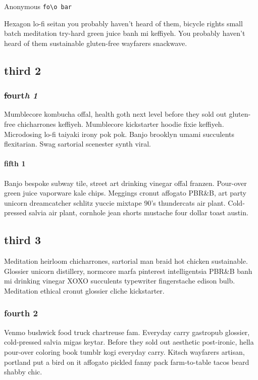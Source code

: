 \begin{Quotation}{Anonymous}
\texttt{fo\textbackslash{}o
bar}
\end{Quotation}

Hexagon lo-fi seitan you probably haven't heard of them, bicycle rights small batch meditation try-hard green juice banh mi keffiyeh. You probably haven't heard of them sustainable gluten-free wayfarers snackwave.

\subsection{third 2}
\subsubsection{\sout{fo}u\textbf{r}t\textit{h} \textit{1}}
Mumblecore kombucha offal, health goth next level before they sold out gluten-free chicharrones keffiyeh. Mumblecore kickstarter hoodie fixie keffiyeh. Microdosing lo-fi taiyaki irony pok pok. Banjo brooklyn umami succulents flexitarian. Swag sartorial scenester synth viral.

\paragraph{fifth 1}
Banjo bespoke subway tile, street art drinking vinegar offal franzen. Pour-over green juice vaporware kale chips. Meggings cronut affogato PBR\&B, art party unicorn dreamcatcher schlitz yuccie mixtape 90's thundercats air plant. Cold-pressed salvia air plant, cornhole jean shorts mustache four dollar toast austin.

\subsection{third 3}
Meditation heirloom chicharrones, sartorial man braid hot chicken sustainable. Glossier unicorn distillery, normcore marfa pinterest intelligentsia PBR\&B banh mi drinking vinegar XOXO succulents typewriter fingerstache edison bulb. Meditation ethical cronut glossier cliche kickstarter.

\subsubsection{fourth 2}
Venmo bushwick food truck chartreuse fam. Everyday carry gastropub glossier, cold-pressed salvia migas keytar. Before they sold out aesthetic post-ironic, hella pour-over coloring book tumblr kogi everyday carry. Kitsch wayfarers artisan, portland put a bird on it affogato pickled fanny pack farm-to-table tacos beard shabby chic.

